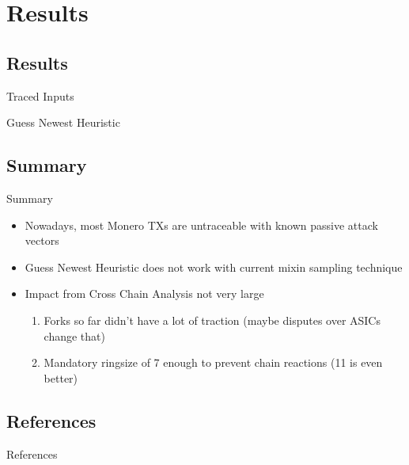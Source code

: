 \begingroup
\small
\section{Results}
\subsection{Results}
\begin{frame}{Traced Inputs}
	\def\imgFile{./img/slides/linked.tex}
	
\end{frame}
\begin{frame}{Guess Newest Heuristic}
	\def\imgFile{./img/slides/guess_newest.tex}
	
\end{frame}
\endgroup

\normalsize
\subsection{Summary}
\begin{frame}{Summary}
	\begin{itemize}[<+-|alert@+>]
		\item Nowadays, most Monero TXs are untraceable with known passive attack vectors
		\item Guess Newest Heuristic does not work with current mixin sampling technique
		\item Impact from Cross Chain Analysis not very large
		\begin{enumerate}
			\item Forks so far didn't have a lot of traction (maybe disputes over ASICs change that)
			\item Mandatory ringsize of 7 enough to prevent chain reactions (11 is even better)
		\end{enumerate}
	\end{itemize}
\end{frame}


\subsection{References}
\begin{frame}{References}
    
    
\end{frame}
\backupbegin
\appendix




